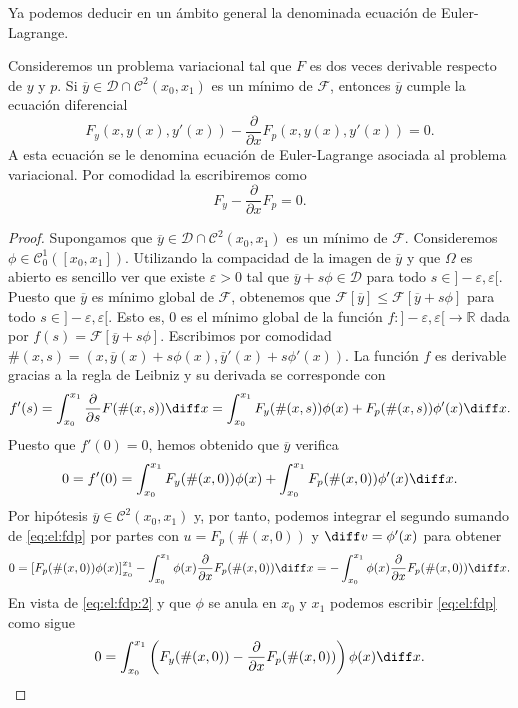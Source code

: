 \documentclass{article}
\begin{document}
Ya podemos deducir en un ámbito general la denominada ecuación de Euler-Lagrange.

\begin{thm} \label{thm:el} Consideremos un
  problema variacional tal que $F$ es dos veces derivable respecto de $y$ y $p$. Si
  $\overline{y} \in \mathcal{D} \cap \mathcal{C}^2(x_0, x_1)$ es un mínimo de $\mathcal{F}$,
  entonces $\overline{y}$ cumple la ecuación diferencial
  \[F_y(x, y(x), y'(x)) - \frac{\partial}{\partial x} F_p(x, y(x), y'(x)) = 0.\] A esta ecuación se
  le denomina ecuación de Euler-Lagrange asociada al problema variacional. Por comodidad la
  escribiremos como
  \[F_y - \frac{\partial}{\partial x} F_p = 0.\]
\end{thm}
\begin{proof}
  Supongamos que $\overline{y} \in \mathcal{D} \cap \mathcal{C}^2(x_0, x_1)$ es un mínimo de
  $\mathcal{F}$. Consideremos $\phi \in \mathcal{C}^1_0([x_0, x_1])$. Utilizando la compacidad de la
  imagen de $\overline{y}$ y que $\Omega$ es abierto es sencillo ver que existe $\varepsilon > 0$
  tal que $\overline{y} + s \phi \in \mathcal{D}$ para todo $s \in ]-\varepsilon,
  \varepsilon[$. Puesto que $\overline{y}$ es mínimo global de $\mathcal{F}$, obtenemos que
  $\mathcal{F}[\overline{y}] \le \mathcal{F}[\overline{y} + s \phi]$ para todo
  $s \in ]-\varepsilon, \varepsilon[$. Esto es, $0$ es el mínimo global de la función
  $f\colon ]-\varepsilon, \varepsilon[ \to \mathbb{R}$ dada por
  $f(s) = \mathcal{F}[\overline{y} + s \phi]$. Escribimos por comodidad
  $\#(x, s) = (x, \overline{y}(x) + s \phi(x), \overline{y}'(x) + s \phi'(x))$. La función $f$ es
  derivable gracias a la regla de Leibniz y su derivada se corresponde con
  \[f'(s) = \int_{x_0}^{x_1} \frac{\partial}{\partial s} F(\#(x, s)) \diff x = \int_{x_0}^{x_1}
    F_y(\#(x, s)) \phi(x) + F_p(\#(x, s)) \phi'(x) \diff x.\] Puesto que $f'(0) = 0$, hemos obtenido
  que $\overline{y}$ verifica
  \begin{equation} \label{eq:el:fdp} 0 = f'(0) = \int_{x_0}^{x_1} F_y(\#(x, 0)) \phi(x) +
    \int_{x_0}^{x_1} F_p(\#(x, 0)) \phi'(x) \diff x.
  \end{equation}
  Por hipótesis $\overline{y} \in \mathcal{C}^2(x_0, x_1)$ y, por tanto, podemos integrar el segundo
  sumando de \eqref{eq:el:fdp} por partes con $u = F_p(\#(x, 0))$ y $\diff v = \phi'(x)$ para
  obtener
  \begin{equation} \label{eq:el:fdp:2} 0 = \left[F_p(\#(x, 0)) \phi(x)\right]_{x_0}^{x_1} -
    \int_{x_0}^{x_1} \phi(x) \frac{\partial}{\partial x} F_p(\#(x, 0)) \diff x = - \int_{x_0}^{x_1}
    \phi(x) \frac{\partial}{\partial x} F_p(\#(x, 0)) \diff x.
  \end{equation}
  En vista de \eqref{eq:el:fdp:2} y que $\phi$ se anula en $x_0$ y $x_1$ podemos escribir
  \eqref{eq:el:fdp} como sigue
  \begin{equation} \label{eq:el:fd} 0 = \int_{x_0}^{x_1} \left(F_y(\#(x, 0)) -
      \frac{\partial}{\partial x} F_p(\#(x, 0))\right) \phi(x) \diff x.
  \end{equation}
  

\end{proof}
\end{document}
